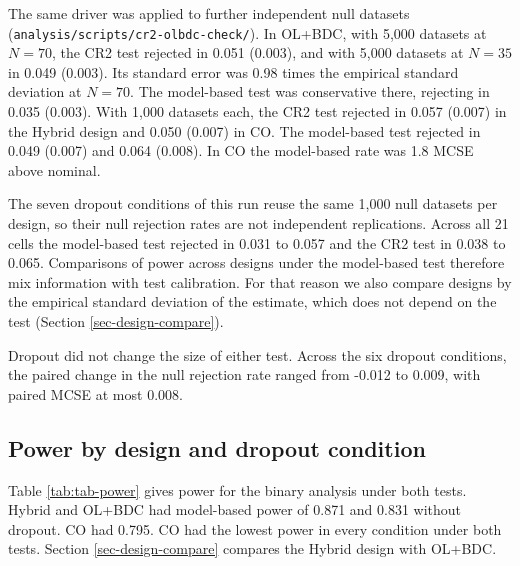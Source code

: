 \documentclass[
  11pt,
]{article}
\begin{document}
The same driver was applied to further independent null datasets
(\texttt{analysis/scripts/cr2-olbdc-check/}). In OL+BDC, with
5,000 datasets at \(N = 70\), the CR2 test rejected in
0.051 (0.003), and with
5,000 datasets at \(N = 35\) in
0.049 (0.003). Its standard error was
0.98 times the empirical standard deviation at
\(N = 70\). The model-based test was conservative there, rejecting in
0.035 (0.003). With
1,000 datasets each, the CR2 test rejected in
0.057 (0.007) in
the Hybrid design and
0.050 (0.007) in CO. The
model-based test rejected in
0.049 (0.007) and
0.064 (0.008). In CO the
model-based rate was
1.8
MCSE above nominal.

The seven dropout conditions of this run reuse the same
1,000 null datasets per design, so their null
rejection rates are not independent replications. Across all
21 cells the model-based test rejected in
0.031 to
0.057 and the CR2 test in
0.038 to
0.065. Comparisons of power across
designs under the model-based test therefore mix information with test
calibration. For that reason we also compare designs by the empirical
standard deviation of the estimate, which does not depend on the test
(Section \ref{sec-design-compare}).

Dropout did not change the size of either test. Across the six dropout
conditions, the paired change in the null rejection rate ranged from
-0.012 to
0.009, with paired MCSE at
most 0.008.

\subsection{Power by design and dropout condition}\label{sec-power}

Table \ref{tab:tab-power} gives power for the binary analysis under
both tests. Hybrid and OL+BDC had model-based power of
0.871 and
0.831 without dropout. CO
had 0.795. CO had the lowest
power in every condition under both tests. Section
\ref{sec-design-compare} compares the Hybrid design with OL+BDC.
\end{document}
